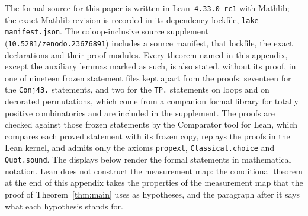 \documentclass[11pt]{article}
\theoremstyle{definition}
\newcommand{\SourceSupplementRef}{\href{https://doi.org/10.5281/zenodo.23676891}{\nolinkurl{10.5281/zenodo.23676891}}}
\begin{document}
The formal source for this paper is written in Lean~\texttt{4.33.0-rc1} with Mathlib; the exact
Mathlib revision is recorded in its dependency lockfile, \texttt{lake-manifest.json}. The coloop-inclusive
source supplement (\SourceSupplementRef) includes a source manifest, that lockfile, the exact
declarations and their proof modules. Every theorem named in this appendix, except the auxiliary lemmas
marked as such, is also stated, without its proof, in one of nineteen frozen
statement files kept apart from the proofs: seventeen for the \texttt{Conj43.} statements, and two for the
\texttt{TP.} statements on loops and on decorated permutations, which come from a companion formal
library for totally positive combinatorics and are included in the supplement. The proofs are checked
against those frozen statements by
the Comparator tool for Lean, which compares each proved statement with its frozen copy, replays the
proofs in the Lean kernel, and admits only the axioms \texttt{propext}, \texttt{Classical.choice} and
\texttt{Quot.sound}. The displays below render the formal statements in mathematical notation. Lean does
not construct the measurement map: the conditional theorem at the end of this appendix takes the
properties of the measurement map that the proof of Theorem~\ref{thm:main} uses as hypotheses, and the
paragraph after it says what each hypothesis stands for.
\end{document}
